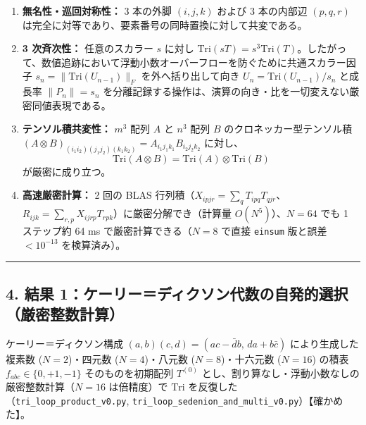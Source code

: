 \documentclass[
  a4paper,
]{ltjsarticle}
\providecommand{\tightlist}{%
  \setlength{\itemsep}{0pt}\setlength{\parskip}{0pt}}
\begin{document}
\begin{enumerate}
\def\labelenumi{\arabic{enumi}.}
\tightlist
\item
  \textbf{無名性・巡回対称性：} 3 本の外脚 \((i, j, k)\) および 3
  本の内部辺 \((p, q, r)\)
  は完全に対等であり、要素番号の同時置換に対して共変である。
\item
  \textbf{3 次斉次性：} 任意のスカラー \(s\) に対し
  \(\mathrm{Tri}(s T) = s^3 \mathrm{Tri}(T)\)。したがって、数値追跡において浮動小数オーバーフローを防ぐために共通スカラー因子
  \(s_n = \|\mathrm{Tri}(U_{n-1})\|_F\) を外へ括り出して向き
  \(U_n = \mathrm{Tri}(U_{n-1}) / s_n\) と成長率 \(\|P_n\| = s_n\)
  を分離記録する操作は、演算の向き・比を一切変えない厳密同値表現である。
\item
  \textbf{テンソル積共変性：} \(m^3\) 配列 \(A\) と \(n^3\) 配列 \(B\)
  のクロネッカー型テンソル積
  \((A \otimes B)_{(i_1 i_2)(j_1 j_2)(k_1 k_2)} = A_{i_1 j_1 k_1} B_{i_2 j_2 k_2}\)
  に対し、
  \[\mathrm{Tri}(A \otimes B) = \mathrm{Tri}(A) \otimes \mathrm{Tri}(B) \tag{2}\]
  が厳密に成り立つ。
\item
  \textbf{高速厳密計算：} 2 回の BLAS
  行列積（\(X_{ipjr} = \sum_q T_{ipq} T_{qjr}\)、\(R_{ijk} = \sum_{r,p} X_{ijrp} T_{rpk}\)）に厳密分解でき（計算量
  \(O(N^5)\)）、\(N = 64\) でも 1 ステップ約 64 ms
  で厳密計算できる（\(N = 8\) で直接 \texttt{einsum} 版と誤差
  \(< 10^{-13}\) を検算済み）。
\end{enumerate}

\begin{center}\rule{0.5\linewidth}{0.5pt}\end{center}

\subsection{4. 結果
1：ケーリー＝ディクソン代数の自発的選択（厳密整数計算）}\label{ux7d50ux679c-1ux30b1ux30fcux30eaux30fcux30c7ux30a3ux30afux30bdux30f3ux4ee3ux6570ux306eux81eaux767aux7684ux9078ux629eux53b3ux5bc6ux6574ux6570ux8a08ux7b97}

ケーリー＝ディクソン構成
\((a,b)(c,d) = (ac - \bar{d}b,\, da + b\bar{c})\) により生成した複素数
(\(N=2\))・四元数 (\(N=4\))・八元数 (\(N=8\))・十六元数 (\(N=16\))
の積表 \(f_{abc} \in \{0, +1, -1\}\) そのものを初期配列 \(T^{(0)}\)
とし、割り算なし・浮動小数なしの厳密整数計算（\(N=16\) は倍精度）で
\(\mathrm{Tri}\) を反復した（\texttt{tri\_\allowbreak{}loop\_\allowbreak{}product\_\allowbreak{}v0.py},
\texttt{tri\_\allowbreak{}loop\_\allowbreak{}sedenion\_\allowbreak{}and\_\allowbreak{}multi\_\allowbreak{}v0.py}）【確かめた】。
\end{document}
